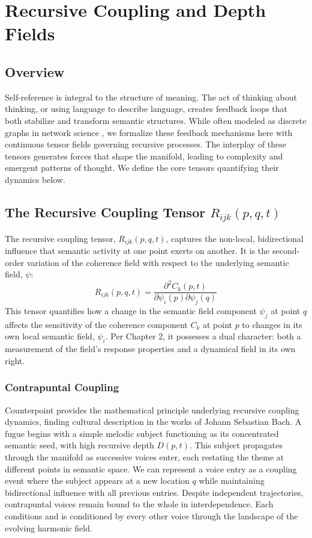 \chapter{Recursive Coupling and Depth Fields}\label{ch:recursive_coupling}

\section{Overview}

Self-reference is integral to the structure of meaning. The act of thinking about thinking, or using language to describe language, creates feedback loops that both stabilize and transform semantic structures. While often modeled as discrete graphs in network science \autocite{Barabasi2016}, we formalize these feedback mechanisms here with continuous tensor fields governing recursive processes. The interplay of these tensors generates forces that shape the manifold, leading to complexity and emergent patterns of thought. We define the core tensors quantifying their dynamics below.

\section{\texorpdfstring{The Recursive Coupling Tensor $R_{ijk}(p, q, t)$}{The Recursive Coupling Tensor R_ijk(p, q, t)}}

The recursive coupling tensor, \(R_{ijk}(p, q, t)\), captures the non-local, bidirectional influence that semantic activity at one point exerts on another. It is the second-order variation of the coherence field with respect to the underlying semantic field, \(\psi\):
\begin{equation}
R_{ijk}(p, q, t) = \frac{\partial^2 C_k(p,t)}{\partial \psi_i(p) \partial \psi_j(q)}
\end{equation}
This tensor quantifies how a change in the semantic field component \(\psi_j\) at point \(q\) affects the sensitivity of the coherence component \(C_k\) at point \(p\) to changes in its own local semantic field, \(\psi_i\). Per Chapter 2, it possesses a dual character: both a measurement of the field's response properties and a dynamical field in its own right.

\subsection{Contrapuntal Coupling}

Counterpoint provides the mathematical principle underlying recursive coupling dynamics, finding cultural description in the works of Johann Sebastian Bach. A fugue begins with a simple melodic subject functioning as its concentrated semantic seed, with high recursive depth \(D(p,t)\). This subject propagates through the manifold as successive voices enter, each restating the theme at different points in semantic space. We can represent a voice entry as a coupling event where the subject appears at a new location \(q\) while maintaining bidirectional influence with all previous entries. Despite independent trajectories, contrapuntal voices remain bound to the whole in interdependence. Each conditions and is conditioned by every other voice through the landscape of the evolving harmonic field.

